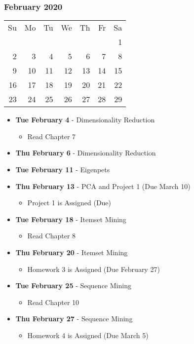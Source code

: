 \subsubsection*{February 2020}
\begin{tabular}{rrrrrrr}
Su & Mo & Tu & We & Th & Fr & Sa\\
   &    &    &    &    &    &  1\\ 
 2 &  3 &  4 &  5 &  6 &  7 &  8\\ 
 9 & 10 & 11 & 12 & 13 & 14 & 15\\ 
16 & 17 & 18 & 19 & 20 & 21 & 22\\ 
23 & 24 & 25 & 26 & 27 & 28 & 29\\ 
\end{tabular}
\begin{itemize}
\item\textbf{Tue February  4} - Dimensionality Reduction
    \begin{itemize}
        \item Read Chapter 7
    \end{itemize}
\item\textbf{Thu February  6} - Dimensionality Reduction
\item\textbf{Tue February 11} - Eigenpets
\item\textbf{Thu February 13} - PCA and Project 1 (Due March 10)
    \begin{itemize}
        \item Project 1 is Assigned (Due)
    \end{itemize}
\item\textbf{Tue February 18} - Itemset Mining
    \begin{itemize}
        \item Read Chapter 8
    \end{itemize}
\item\textbf{Thu February 20} - Itemset Mining
    \begin{itemize}
        \item Homework 3 is Assigned (Due February 27)
    \end{itemize}
\item\textbf{Tue February 25} - Sequence Mining
    \begin{itemize}
        \item Read Chapter 10
    \end{itemize}
\item\textbf{Thu February 27} - Sequence Mining
    \begin{itemize}
        \item Homework 4 is Assigned (Due March 5)
    \end{itemize}
\end{itemize}
\hrulefill

